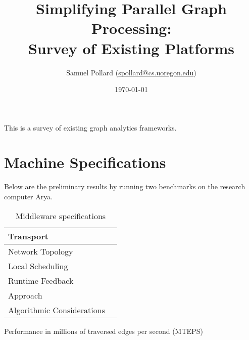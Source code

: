 \documentclass[11pt]{article}
\begin{document}
\title{Simplifying Parallel Graph Processing: \\
	\large Survey of Existing Platforms
}
\author{Samuel Pollard (\href{mailto:spollard@cs.uoregon.edu}{spollard@cs.uoregon.edu})}
\date{\today}
\maketitle

This is a survey of existing graph analytics frameworks.

\section{Machine Specifications}
Below are the preliminary results by running two benchmarks on the research computer Arya.

\begin{table}[htb]
	\centering

	\caption{Machine specifications.}
	\label{tab:specs}
\end{table}

\begin{table}[htb]
	\centering
	\begin{tabular}{lr}
		Transport & \\ \hline
		Network Topology & \\ \hline
		Local Scheduling & \\ \hline
		Runtime Feedback & \\ \hline
		Approach & \\ \hline
		Algorithmic Considerations & \\ \hline
	\end{tabular}
	\caption{Middleware specifications}
	\label{tab:reportcard}
\end{table}

Performance in millions of traversed edges per second (MTEPS)
\end{document}

